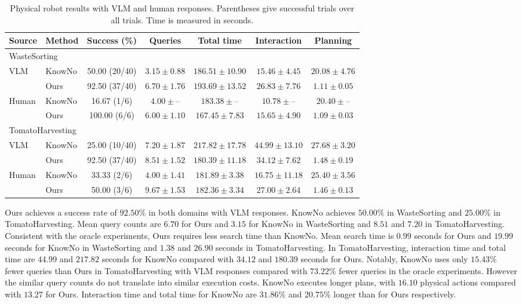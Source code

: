 \begin{table}[t]
\centering
\caption{Physical robot results with VLM and human responses. Parentheses give successful trials over all trials. Time is measured in seconds.}
\label{tab:physical_robot_results}
\small
\begin{tabular}{llccccc}
\toprule
Source & Method & Success (\%) & Queries & Total time & Interaction & Planning \\
\midrule
\multicolumn{7}{l}{WasteSorting} \\
VLM & KnowNo & 50.00 (20/40) & $3.15 \pm 0.88$ & $186.51 \pm 10.90$ & $15.46 \pm 4.45$ & $20.08 \pm 4.76$ \\
 & Ours & 92.50 (37/40) & $6.70 \pm 1.76$ & $193.69 \pm 13.52$ & $26.83 \pm 7.76$ & $1.11 \pm 0.05$ \\
Human & KnowNo & 16.67 (1/6) & $4.00 \pm \text{--}$ & $183.38 \pm \text{--}$ & $10.78 \pm \text{--}$ & $20.40 \pm \text{--}$ \\
 & Ours & 100.00 (6/6) & $6.00 \pm 1.10$ & $167.45 \pm 7.83$ & $15.65 \pm 4.90$ & $1.09 \pm 0.03$ \\
\midrule
\multicolumn{7}{l}{TomatoHarvesting} \\
VLM & KnowNo & 25.00 (10/40) & $7.20 \pm 1.87$ & $217.82 \pm 17.78$ & $44.99 \pm 13.10$ & $27.68 \pm 3.20$ \\
 & Ours & 92.50 (37/40) & $8.51 \pm 1.52$ & $180.39 \pm 11.18$ & $34.12 \pm 7.62$ & $1.48 \pm 0.19$ \\
Human & KnowNo & 33.33 (2/6) & $4.00 \pm 1.41$ & $181.89 \pm 3.38$ & $16.75 \pm 11.18$ & $25.40 \pm 3.56$ \\
 & Ours & 50.00 (3/6) & $9.67 \pm 1.53$ & $182.36 \pm 3.34$ & $27.00 \pm 2.64$ & $1.46 \pm 0.13$ \\
\bottomrule
\end{tabular}
\end{table}

Ours achieves a success rate of $92.50\%$ in both domains with VLM responses. KnowNo achieves $50.00\%$ in WasteSorting and $25.00\%$ in TomatoHarvesting. Mean query counts are $6.70$ for Ours and $3.15$ for KnowNo in WasteSorting and $8.51$ and $7.20$ in TomatoHarvesting. Consistent with the oracle experiments, Ours requires less search time than KnowNo. Mean search time is $0.99$ seconds for Ours and $19.99$ seconds for KnowNo in WasteSorting and $1.38$ and $26.90$ seconds in TomatoHarvesting. In TomatoHarvesting, interaction time and total time are $44.99$ and $217.82$ seconds for KnowNo compared with $34.12$ and $180.39$ seconds for Ours. Notably, KnowNo uses only $15.43\%$ fewer queries than Ours in TomatoHarvesting with VLM responses compared with $73.22\%$ fewer queries in the oracle experiments. However the similar query counts do not translate into similar execution costs. KnowNo executes longer plans, with $16.10$ physical actions compared with $13.27$ for Ours. Interaction time and total time for KnowNo are $31.86\%$ and $20.75\%$ longer than for Ours respectively.

